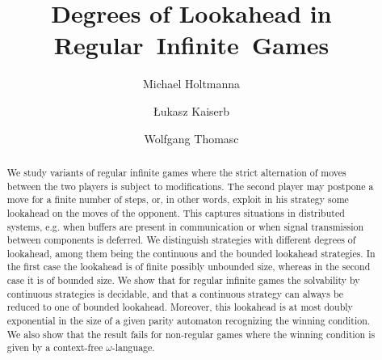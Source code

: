 \documentclass[fleqn,envcountsame]{LMCS}
\newcommand{\eg}{e.g.\xspace}
\begin{document}
\title[Degrees of Lookahead in Regular~Infinite~Games]{Degrees of Lookahead in Regular~Infinite~Games}

\author[M.~Holtmann]{Michael Holtmann\rsuper a}
\address{{\lsuper a}Lehrstuhl f{\"u}r Informatik 7, RWTH Aachen University}

\author[{\L}.~Kaiser]{{\L}ukasz Kaiser\rsuper b}
\address{{\lsuper b}LIAFA, CNRS \& Universit{\'e} Paris Diderot -- Paris 7}

\author[W.~Thomas]{Wolfgang Thomas\rsuper c}
\address{{\lsuper c}Lehrstuhl f{\"u}r Informatik 7, RWTH Aachen University}


\begin{abstract}
We study variants of regular infinite games where the strict alternation
of moves between the two players is subject to modifications.
The second player may postpone a move for a finite number of steps,
or, in other words, exploit in his strategy some lookahead on the moves
of the opponent. This captures situations in distributed systems, \eg
when buffers are present in communication or when signal transmission
between components is deferred. We distinguish strategies with
different degrees of lookahead, among them being the continuous and
the bounded lookahead strategies. In the first case the lookahead is of finite
possibly unbounded size, whereas in the second case it is of bounded size.
We show that for regular infinite games the solvability by continuous strategies
is decidable, and that a continuous strategy can always be reduced to one
of bounded lookahead. Moreover, this lookahead is at most doubly exponential
in the size of a given parity automaton recognizing the winning condition.
We also show that the result fails for non-regular games
where the winning condition is given by a context-free $\omega$-language.
\end{abstract}

\maketitle
\end{document}
